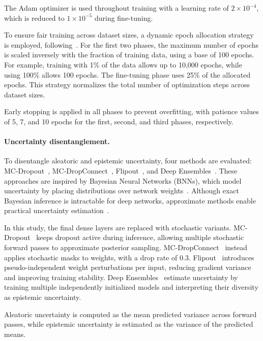 \documentclass[runningheads]{llncs}
\begin{document}
The Adam optimizer is used throughout training with a learning rate of $2 \times 10^{-4}$, which is reduced to $1 \times 10^{-5}$ during fine-tuning.

To ensure fair training across dataset sizes, a dynamic epoch allocation strategy is employed, following~\cite{dejong2025measuring}. For the first two phases, the maximum number of epochs is scaled inversely with the fraction of training data, using a base of 100 epochs. For example, training with 1\% of the data allows up to 10,000 epochs, while using 100\% allows 100 epochs. The fine-tuning phase uses 25\% of the allocated epochs. This strategy normalizes the total number of optimization steps across dataset sizes.

Early stopping is applied in all phases to prevent overfitting, with patience values of 5, 7, and 10 epochs for the first, second, and third phases, respectively.

\paragraph{Uncertainty disentanglement.}
To disentangle aleatoric and epistemic uncertainty, four methods are evaluated: MC-Dropout~\cite{gal2016dropout}, MC-DropConnect~\cite{mobiny2021dropconnect}, Flipout~\cite{wen2018flipout}, and Deep Ensembles~\cite{lakshminarayanan2017simple}. These approaches are inspired by Bayesian Neural Networks (BNNs), which model uncertainty by placing distributions over network weights~\cite{blundell2015weight}. Although exact Bayesian inference is intractable for deep networks, approximate methods enable practical uncertainty estimation~\cite{kendall2017uncertainties}.

In this study, the final dense layers are replaced with stochastic variants. MC-Dropout~\cite{gal2016dropout} keeps dropout active during inference, allowing multiple stochastic forward passes to approximate posterior sampling. MC-DropConnect~\cite{wan2013regularization} instead applies stochastic masks to weights, with a drop rate of 0.3. Flipout~\cite{wen2018flipout} introduces pseudo-independent weight perturbations per input, reducing gradient variance and improving training stability. Deep Ensembles~\cite{lakshminarayanan2017simple} estimate uncertainty by training multiple independently initialized models and interpreting their diversity as epistemic uncertainty.

Aleatoric uncertainty is computed as the mean predicted variance across forward passes, while epistemic uncertainty is estimated as the variance of the predicted means.
\end{document}
